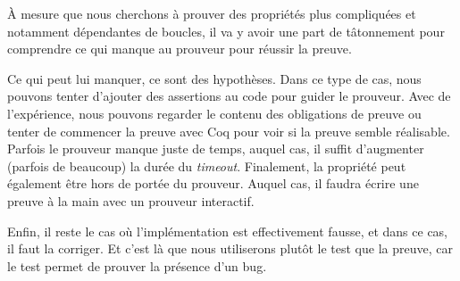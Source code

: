 


À mesure que nous cherchons à prouver des propriétés plus compliquées et 
notamment dépendantes de boucles, il va y avoir une part de tâtonnement pour
comprendre ce qui manque au prouveur pour réussir la preuve.



Ce qui peut lui manquer, ce sont des hypothèses. Dans ce type de cas, nous
pouvons tenter d'ajouter des assertions au code pour guider le prouveur. Avec
de l'expérience, nous pouvons regarder le contenu des obligations de preuve ou 
tenter de commencer la preuve avec Coq pour voir si la preuve semble réalisable. 
Parfois le prouveur manque juste de temps, auquel cas, il suffit d'augmenter 
(parfois de beaucoup) la durée du \textit{timeout}. Finalement, la propriété peut 
également être hors de portée du prouveur. Auquel cas, il faudra écrire une
preuve à la main avec un prouveur interactif.



Enfin, il reste le cas où l'implémentation est effectivement fausse, et dans ce
cas, il faut la corriger. Et c'est là que nous utiliserons plutôt le test que la
preuve, car le test permet de prouver la présence d'un bug.
